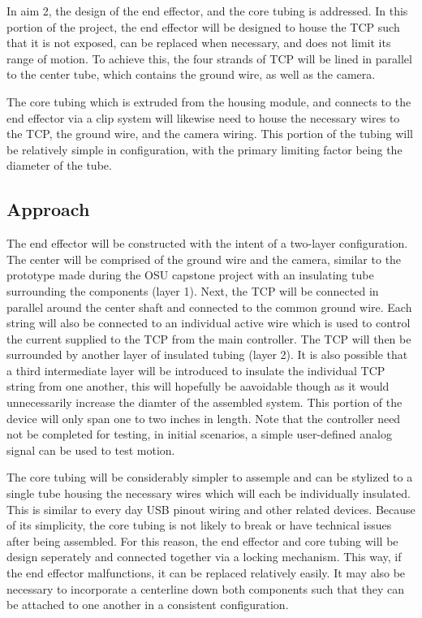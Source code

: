 In aim 2, the design of the end effector, and the core tubing is addressed. In this portion of the project, the end effector will be designed to house the TCP such that it is not exposed, can be replaced when necessary, and does not limit its range of motion. To achieve this, the four strands of TCP will be lined in parallel to the center tube, which contains the ground wire, as well as the camera.

The core tubing which is extruded from the housing module, and connects to the end effector via a clip system will likewise need to house the necessary wires to the TCP, the ground wire, and the camera wiring. This portion of the tubing will be relatively simple in configuration, with the primary limiting factor being the diameter of the tube.

\subsection{Approach}

The end effector will be constructed with the intent of a two-layer configuration. The center will be comprised of the ground wire and the camera, similar to the prototype made during the OSU capstone project with an insulating tube surrounding the components (layer 1). Next, the TCP will be connected in parallel around the center shaft and connected to the common ground wire. Each string will also be connected to an individual active wire which is used to control the current supplied to the TCP from the main controller. The TCP will then be surrounded by another layer of insulated tubing (layer 2). It is also possible that a third intermediate layer will be introduced to insulate the individual TCP string from one another, this will hopefully be aavoidable though as it would unnecessarily increase the diamter of the assembled system. This portion of the device will only span one to two inches in length. Note that the controller need not be completed for testing, in initial scenarios, a simple user-defined analog signal can be used to test motion.

The core tubing will be considerably simpler to assemple and can be stylized to a single tube housing the necessary wires which will each be individually insulated. This is similar to every day USB pinout wiring and other related devices. Because of its simplicity, the core tubing is not likely to break or have technical issues after being assembled. For this reason, the end effector and core tubing will be design seperately and connected together via a locking mechanism. This way, if the end effector malfunctions, it can be replaced relatively easily. It may also be necessary to incorporate a centerline down both components such that they can be attached to one another in a consistent configuration.

